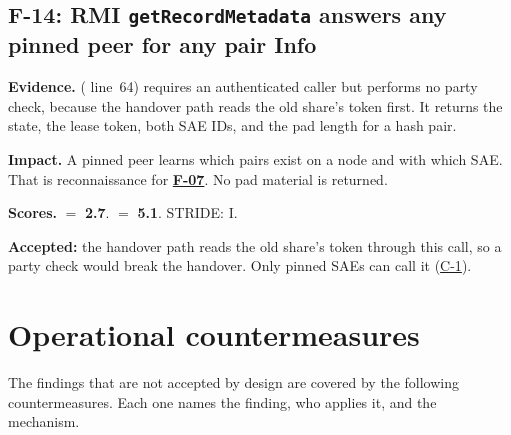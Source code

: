 \documentclass[11pt,a4paper]{article}
\newcommand{\sev}[1]{\textbf{#1}}
\newcommand{\fid}[1]{\textbf{#1}}
\begin{document}
\subsection*{F-14: RMI \texttt{getRecordMetadata} answers any pinned peer for any pair \hfill \sev{Info}}\label{f:F-14}
\textbf{Evidence.}  ( line~64) requires an authenticated caller but performs no party check, because the handover path reads the old share's token first. It returns the state, the lease token, both SAE IDs, and the pad length for a hash pair.

\textbf{Impact.} A pinned peer learns which pairs exist on a node and with which SAE. That is reconnaissance for \hyperref[f:F-07]{\fid{F-07}}. No pad material is returned.

\textbf{Scores.}  $=$ \textbf{2.7}.  $=$ \textbf{5.1}. STRIDE: I.

\textbf{Accepted:} the handover path reads the old share's token through this call, so a party check would break the handover. Only pinned SAEs can call it (\hyperref[c:C-1]{C-1}).

\section{Operational countermeasures}\label{sec:countermeasures}
The findings that are not accepted by design are covered by the following countermeasures. Each one names the finding, who applies it, and the mechanism.
\end{document}
